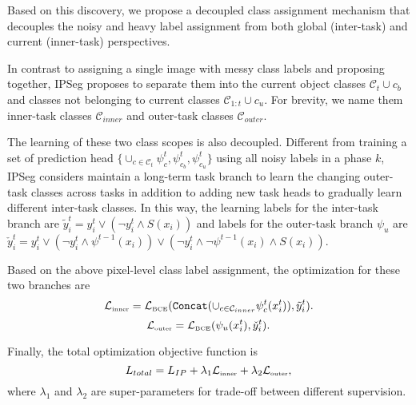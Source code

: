 Based on this discovery, we propose a decoupled class assignment mechanism that decouples the noisy and heavy label assignment from both global (inter-task) and current (inner-task) perspectives. 

In contrast to assigning a single image with messy class labels and proposing together, IPSeg proposes to separate them into the current object classes $\mathcal{C}_t \cup c_b$ and classes not belonging to current classes $\mathcal{C}_{1:t} \cup c_u$. For brevity, we name them inner-task classes $\mathcal{C}_{inner}$ and outer-task classes $\mathcal{C}_{outer}$. 


The learning of these two class scopes is also decoupled. Different from training a set of prediction head $\{\cup_{c\in\mathcal{C}_t}\psi_c^t, \psi_{c_b}^t, \psi_{c_u}^t\}$ using all noisy labels in a phase $k$, IPSeg considers maintain a long-term task branch to learn the changing outer-task classes across tasks in addition to adding new task heads to gradually learn different inter-task classes. In this way, the learning labels for the inter-task branch are $\tilde{y}_{i}^{t} = y_i^t \vee (\neg y_i^t \wedge S(x_i))$ and labels for the outer-task branch $\psi_u$ are $\check{y}_{i}^t = y_i^t \vee (\neg y_i^t \wedge \psi^{t-1}(x_i)) \vee (\neg y_i^t \wedge \neg \psi^{t-1}(x_i) \wedge S(x_i))$. 

Based on the above pixel-level class label assignment, the optimization for these two branches are 
\begin{equation}
    \mathcal{L}_{\text{\tiny inner}} = \mathcal{L}_{\text{\tiny BCE}}(\texttt{Concat}(\cup_{c \in \mathcal{C}_{inner}} \psi_c^t(x_i^t)), \tilde{y}_i^t).
\end{equation}
\begin{equation}
    \mathcal{L}_{\text{\tiny outer}} = \mathcal{L}_{\text{\tiny BCE}}(\psi_u(x_i^t), \check{y}_i^t).
\end{equation}

Finally, the total optimization objective function is 
\begin{equation}
    L_{total}=L_{IP}+\lambda_{1}\mathcal{L}_{\text{\tiny inner}}+\lambda_{2}\mathcal{L}_{\text{\tiny outer}},
\end{equation}
where $\lambda_1$ and $\lambda_2$ are super-parameters for trade-off between different supervision.
\fi

